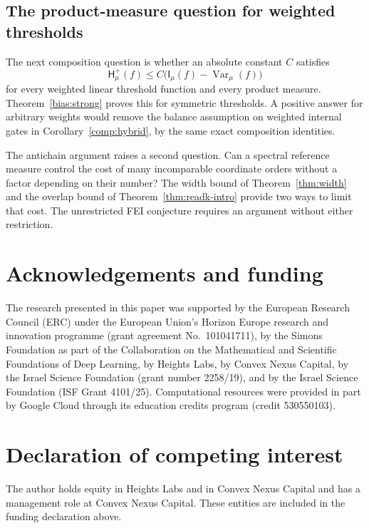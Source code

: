 \documentclass[11pt]{amsart}
\theoremstyle{definition}
\theoremstyle{remark}
\newcommand{\HH}{\mathsf H}
\newcommand{\I}{\mathsf I}
\DeclareMathOperator{\Var}{Var}
\begin{document}
\subsection{The product-measure question for weighted thresholds}

The next composition question is whether an absolute constant $C$ satisfies
\[
 \HH_\mu^+(f)\le C\bigl(\I_\mu(f)-\Var_\mu(f)\bigr)
\]
for every weighted linear threshold function and every product measure. Theorem~\ref{bias:strong} proves this for symmetric thresholds. A positive answer for arbitrary weights would remove the balance assumption on weighted internal gates in Corollary~\ref{comp:hybrid}, by the same exact composition identities.

The antichain argument raises a second question. Can a spectral reference measure control the cost of many incomparable coordinate orders without a factor depending on their number? The width bound of Theorem~\ref{thm:width} and the overlap bound of Theorem~\ref{thm:readk-intro} provide two ways to limit that cost. The unrestricted FEI conjecture requires an argument without either restriction.

\section*{Acknowledgements and funding}
The research presented in this paper was supported by the European Research
Council (ERC) under the European Union's Horizon Europe research and
innovation programme (grant agreement No.~101041711), by the Simons
Foundation as part of the Collaboration on the Mathematical and Scientific
Foundations of Deep Learning, by Heights Labs, by Convex Nexus Capital, by
the Israel Science Foundation (grant number 2258/19), and by the Israel
Science Foundation (ISF Grant 4101/25). Computational resources were
provided in part by Google Cloud through its education credits program
(credit 530550103).

\section*{Declaration of competing interest}
The author holds equity in Heights Labs and in Convex Nexus Capital and
has a management role at Convex Nexus Capital. These entities are included
in the funding declaration above.
\end{document}
